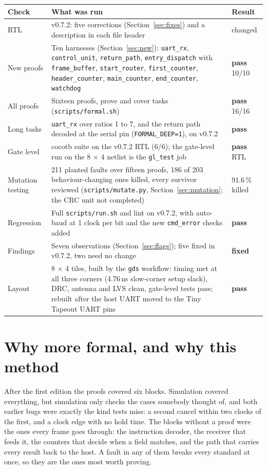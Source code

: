 \documentclass[11pt,a4paper]{article}
\newcommand{\sig}[1]{\texttt{#1}}
\newcommand{\pass}{\textcolor{passc}{\textbf{pass}}}
\newcommand{\fixed}{\textcolor{fixc}{\textbf{fixed}}}
\begin{document}
\begin{center}
\begin{tabularx}{\linewidth}{@{}l L l@{}}
\toprule
Check & What was run & Result \\
\midrule
RTL & v0.7.2: five corrections (Section~\ref{sec:fixes}) and a description in each file header & changed \\
New proofs & Ten harnesses (Section~\ref{sec:new}): \sig{uart\_rx}, \sig{control\_unit}, \sig{return\_path}, \sig{entry\_dispatch} with \sig{frame\_buffer}, \sig{start\_router}, \sig{first\_counter}, \sig{header\_counter}, \sig{main\_counter}, \sig{end\_counter}, \sig{watchdog} & \pass{} 10/10 \\
All proofs & Sixteen proofs, prove and cover tasks (\sig{scripts/formal.sh}) & \pass{} 16/16 \\
Long tasks & \sig{uart\_rx} over ratios 1 to 7, and the return path decoded at the serial pin (\sig{FORMAL\_DEEP=1}), on v0.7.2 & \pass{} \\
Gate level & cocotb suite on the v0.7.2 RTL (6/6); the gate-level run on the 8 $\times$ 4 netlist is the \sig{gl\_test} job & \pass{} RTL \\
Mutation testing & 211 planted faults over fifteen proofs, 186 of 203 behaviour-changing ones killed, every survivor reviewed (\sig{scripts/mutate.py}, Section~\ref{sec:mutation}; the CRC unit not completed) & 91.6\,\% killed \\
Regression & Full \sig{scripts/run.sh} and lint on v0.7.2, with auto-baud at 1 clock per bit and the new \sig{cmd\_error} checks added & \pass \\
Findings & Seven observations (Section~\ref{sec:flags}); five fixed in v0.7.2, two need no change & \fixed \\
Layout & 8 $\times$ 4 tiles, built by the \sig{gds} workflow: timing met at all three corners (4.76\,ns slow-corner setup slack), DRC, antenna and LVS clean, gate-level tests pass; rebuilt after the host UART moved to the Tiny Tapeout UART pins & \pass \\
\bottomrule
\end{tabularx}
\end{center}

\section{Why more formal, and why this method}

After the first edition the proofs covered six blocks. Simulation covered everything, but simulation only checks the cases somebody thought of, and both earlier bugs were exactly the kind tests miss: a second cancel within two clocks of the first, and a clock edge with no hold time. The blocks without a proof were the ones every frame goes through: the instruction decoder, the receiver that feeds it, the counters that decide when a field matches, and the path that carries every result back to the host. A fault in any of them breaks every standard at once, so they are the ones most worth proving.
\end{document}
